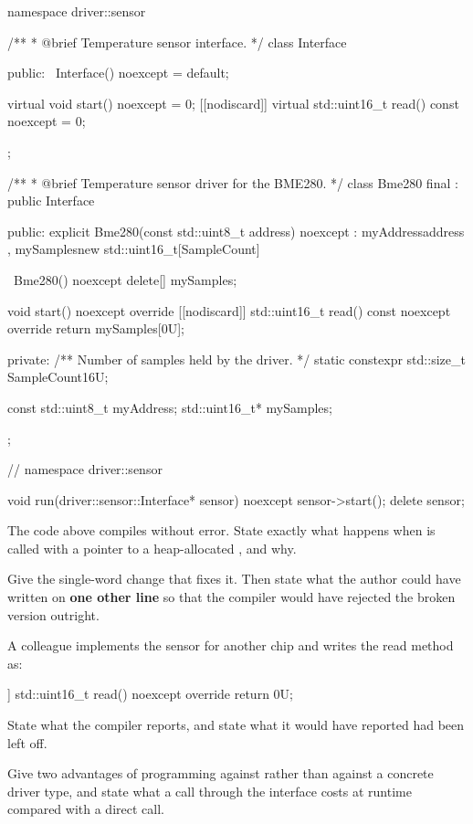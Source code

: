 \begin{cppcode}
namespace driver::sensor
{
/**
 * @brief Temperature sensor interface.
 */
class Interface
{
public:
    ~Interface() noexcept = default;

    virtual void start() noexcept                             = 0;
    [[nodiscard]] virtual std::uint16_t read() const noexcept = 0;
};

/**
 * @brief Temperature sensor driver for the BME280.
 */
class Bme280 final : public Interface
{
public:
    explicit Bme280(const std::uint8_t address) noexcept
        : myAddress{address}
        , mySamples{new std::uint16_t[SampleCount]{}}
    {}

    ~Bme280() noexcept { delete[] mySamples; }

    void start() noexcept override {}
    [[nodiscard]] std::uint16_t read() const noexcept override { return mySamples[0U]; }

private:
    /** Number of samples held by the driver. */
    static constexpr std::size_t SampleCount{16U};

    const std::uint8_t myAddress;
    std::uint16_t* mySamples;
};
} // namespace driver::sensor

void run(driver::sensor::Interface* sensor) noexcept
{
    sensor->start();
    delete sensor;
}
\end{cppcode}

 The code above compiles without error. State exactly what happens when  is
called with a pointer to a heap-allocated , and why. 

 Give the single-word change that fixes it. Then state what the author could have written
on \textbf{one other line} so that the compiler would have rejected the broken version outright.

 A colleague implements the sensor for another chip and writes the read method as:

\begin{cppcode}
[[nodiscard]] std::uint16_t read() noexcept override { return 0U; }
\end{cppcode}

\noindent State what the compiler reports, and state what it would have reported had
 been left off. 

 Give two advantages of programming against  rather than
against a concrete driver type, and state what a call through the interface costs at runtime
compared with a direct call. 


